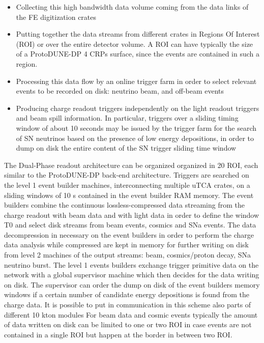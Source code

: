 \begin{itemize}
\item Collecting this high bandwidth data volume coming from the data links of the FE digitization crates 
\item Putting together the data streams from different crates in Regions Of Interest (ROI) or over the entire detector volume. A ROI can have typically the size of a ProtoDUNE-DP 4 CRPs surface, since the events are contained in such a region.
\item Processing this data flow by an online trigger farm in order to select relevant events to be recorded on disk: neutrino beam, and off-beam events
\item Producing charge readout triggers independently on the light readout triggers and beam spill information. In particular, triggers over a sliding timing window of about 10 seconds may be issued by the trigger farm for the search of SN neutrinos based on the presence of low energy depositions, in order to dump on disk the entire content of the SN trigger sliding time window
\end{itemize}

The Dual-Phase readout architecture can be organized organized in 20 ROI, each similar to the ProtoDUNE-DP back-end architecture. Triggers are searched on the level 1 event builder machines, interconnecting multiple uTCA crates, on a sliding windows of 10 s contained in the event builder RAM memory.
The event builders combine the continuous lossless-compressed data streaming from the charge readout with beam data and with light data in order to define the window T0 and select disk streams from beam events, cosmics and SNa events. The data decompression in necessary on the event builders in order to perform the charge data analysis while compressed are kept in memory for further writing on disk from level 2 machines of the output streams: beam, cosmics/proton decay, SNa neutrino burst. The level 1 events builders exchange trigger primitive data on the network with a global supervisor machine which then decides for the data writing on disk. The supervisor can order the dump on disk of the event builders memory  windows if a certain number of candidate energy depositions is found from the charge data. It is possible to put in communication in this scheme also parts of different 10 kton modules
For beam data and cosmic events typically the amount of data written on disk can be limited to one or two ROI in case events are not contained in a single ROI but happen at the border in between two ROI. 


